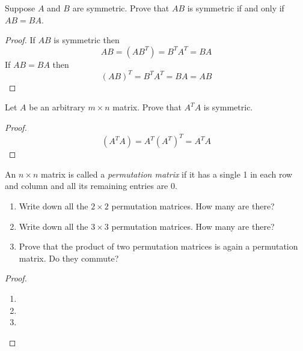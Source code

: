 \begin{exercise} \label{e.1.4.23}
\end{exercise} %

\begin{exercise} \label{e1.4.24}
    Suppose \( A \) and \( B \) are symmetric. Prove that \( AB \) is symmetric if and only if \( AB = BA \).
    
    \begin{proof}
        If \( AB \) is symmetric then
        \[ AB = (AB^T) = B^TA^T = BA \]
        If \( AB = BA \) then
        \[ (AB)^T = B^TA^T = BA = AB \]
    \end{proof}
\end{exercise} %

\begin{exercise} \label{e1.4.25}
    Let \( A \) be an arbitrary \( m \times n \) matrix. Prove that \( A^TA \) is symmetric.
    
    \begin{proof}
        \[ (A^TA) = A^T(A^T)^T = A^TA \]
    \end{proof}
\end{exercise} %

\begin{exercise} \label{e1.4.26}
\end{exercise} %

\begin{exercise} \label{e1.4.27}
\end{exercise} %

\begin{exercise} \label{e1.4.28}
    An \( n \times n \) matrix is called a \emph{permutation matrix} if it has a single 1 in each row and column and all its remaining entries are \( 0 \).
    
    \begin{enumerate}
        \item Write down all the \( 2 \times 2 \) permutation matrices. How many are there?
        
        \item Write down all the \( 3 \times 3 \) permutation matrices. How many are there?
        
        \item Prove that the product of two permutation matrices is again a permutation matrix. Do they commute?
    \end{enumerate}
    
    \begin{proof}
        \begin{enumerate}
            \item 
            
            \item
            
            \item
        \end{enumerate}
    \end{proof}
\end{exercise} %

